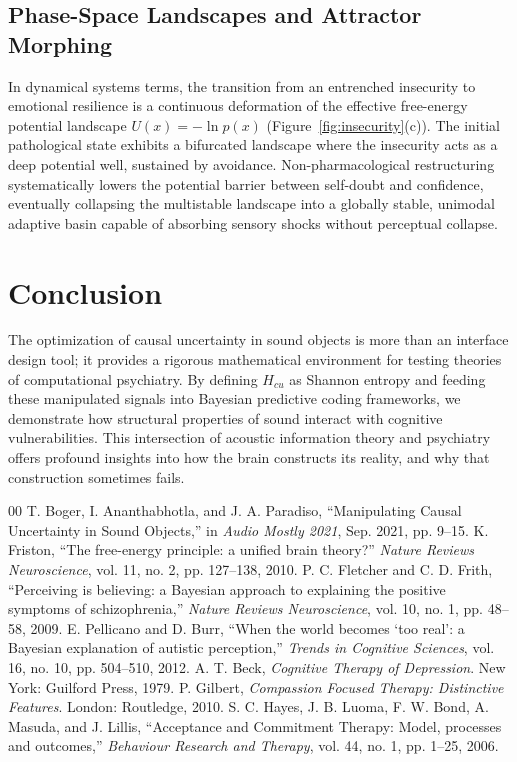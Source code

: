 \documentclass[conference]{IEEEtran}
\begin{document}
\subsection{Phase-Space Landscapes and Attractor Morphing}
In dynamical systems terms, the transition from an entrenched insecurity to emotional resilience is a continuous deformation of the effective free-energy potential landscape $U(x) = -\ln p(x)$ (Figure~\ref{fig:insecurity}(c)). The initial pathological state exhibits a bifurcated landscape where the insecurity acts as a deep potential well, sustained by avoidance. Non-pharmacological restructuring systematically lowers the potential barrier between self-doubt and confidence, eventually collapsing the multistable landscape into a globally stable, unimodal adaptive basin capable of absorbing sensory shocks without perceptual collapse.

\section{Conclusion}

The optimization of causal uncertainty in sound objects is more than an interface design tool; it provides a rigorous mathematical environment for testing theories of computational psychiatry. By defining $H_{cu}$ as Shannon entropy and feeding these manipulated signals into Bayesian predictive coding frameworks, we demonstrate how structural properties of sound interact with cognitive vulnerabilities. This intersection of acoustic information theory and psychiatry offers profound insights into how the brain constructs its reality, and why that construction sometimes fails.

\begin{thebibliography}{00}
 T. Boger, I. Ananthabhotla, and J. A. Paradiso, ``Manipulating Causal Uncertainty in Sound Objects,'' in \emph{Audio Mostly 2021}, Sep. 2021, pp. 9--15.
 K. Friston, ``The free-energy principle: a unified brain theory?'' \emph{Nature Reviews Neuroscience}, vol. 11, no. 2, pp. 127--138, 2010.
 P. C. Fletcher and C. D. Frith, ``Perceiving is believing: a Bayesian approach to explaining the positive symptoms of schizophrenia,'' \emph{Nature Reviews Neuroscience}, vol. 10, no. 1, pp. 48--58, 2009.
 E. Pellicano and D. Burr, ``When the world becomes `too real': a Bayesian explanation of autistic perception,'' \emph{Trends in Cognitive Sciences}, vol. 16, no. 10, pp. 504--510, 2012.
 A. T. Beck, \emph{Cognitive Therapy of Depression}. New York: Guilford Press, 1979.
 P. Gilbert, \emph{Compassion Focused Therapy: Distinctive Features}. London: Routledge, 2010.
 S. C. Hayes, J. B. Luoma, F. W. Bond, A. Masuda, and J. Lillis, ``Acceptance and Commitment Therapy: Model, processes and outcomes,'' \emph{Behaviour Research and Therapy}, vol. 44, no. 1, pp. 1--25, 2006.
\end{thebibliography}
\end{document}
